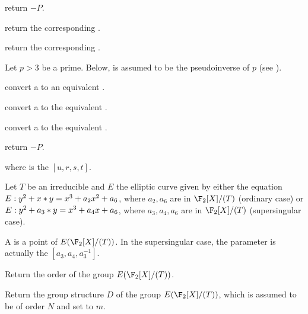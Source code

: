  return $-P$.

 return the corresponding .

 return the corresponding .


Let $p > 3$ be a prime. Below,  is assumed to be the pseudoinverse
of $p$ (see ).

 convert a  to an equivalent .

 convert a  to the equivalent
.

 convert a  to the
equivalent .



 return $-P$.



where  is the  $[u,r,s,t]$.


Let $T$ be an irreducible  and $E$ the
elliptic curve given by either the equation
$E:y^2+x*y=x^3+a_2\*x^2+a_6$, where $a_2, a_6$ are  in
$\F_2[X]/(T)$ (ordinary case) or $E:y^2+a_3*y=x^3+a_4\*x+a_6$, where
$a_3, a_4, a_6$ are  in $\F_2[X]/(T)$ (supersingular case).

A  is a point of $E(\F_2[X]/(T))$.  In the supersingular case, the
parameter  is actually the  $[a_3,a_4,a_3^{-1}]$.

Return the order of the group $E(\F_2[X]/(T))$.

Return the group structure $D$ of the group $E(\F_2[X]/(T))$,
which is assumed to be of order $N$ and set  to $m$.


